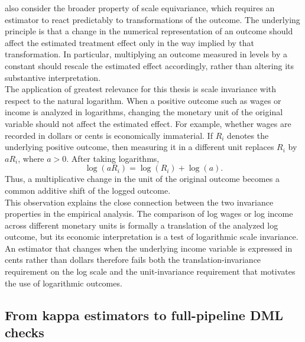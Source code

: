 \documentclass[12pt, a4paper, oneside]{article}
\theoremstyle{plain}
\theoremstyle{definition}
\begin{document}
\citet{sloczynski2025abadie} also consider the broader property of scale equivariance,
which requires an estimator to react predictably to transformations of the outcome.
The underlying principle is that a change in the numerical representation of an
outcome should affect the estimated treatment effect only in the way implied by that
transformation. In particular, multiplying an outcome measured in levels by a
constant should rescale the estimated effect accordingly, rather than altering its
substantive interpretation.\\
The application of greatest relevance for this thesis is scale invariance with respect
to the natural logarithm. When a positive outcome such as wages or income is analyzed
in logarithms, changing the monetary unit of the original variable should not affect
the estimated effect. For example, whether wages are recorded in dollars or cents is
economically immaterial. If \(R_i\) denotes the underlying positive outcome, then
measuring it in a different unit replaces \(R_i\) by \(aR_i\), where \(a>0\).
After taking logarithms,
\begin{equation}
    \log(aR_i)=\log(R_i)+\log(a).
\end{equation}
Thus, a multiplicative change in the unit of the original outcome becomes a common
additive shift of the logged outcome.\\
This observation explains the close connection between the two invariance properties
in the empirical analysis. The comparison of log wages or log income across different
monetary units is formally a translation of the analyzed log outcome, but its economic
interpretation is a test of logarithmic scale invariance. An estimator that changes
when the underlying income variable is expressed in cents rather than dollars therefore
fails both the translation-invariance requirement on the log scale and the unit-invariance
requirement that motivates the use of logarithmic outcomes.



\subsection{From kappa estimators to full-pipeline DML checks}
\label{subsec:full_pipeline_invariance}
\end{document}
